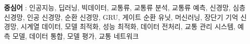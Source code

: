 \documentclass[11pt]{report}
\begin{document}
\textbf{중심어} : 인공지능, 딥러닝, 빅데이터, 교통류, 교통류 분석, 교통류 예측, 신경망, 심층 신경망, 인공 신경망, 순환 신경망, GRU, 게이트 순환 유닛, 머신러닝, 장단기 기억 신경망, 시계열 데이터, 모델 최적화, 성능 최적화, 데이터 전처리, 교통 관리 시스템, 예측 모델, 데이터 통합, 모델 평가, 교통 네트워크


\end{document}
